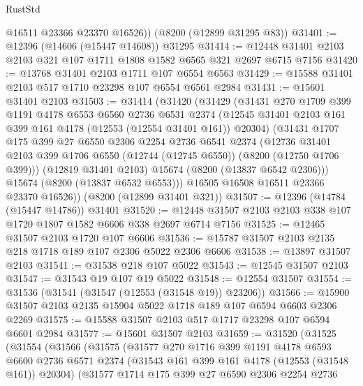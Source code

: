 \begin{lexlean}{RustStd}
\begin{coremodule}
        @16511
        @23366
        @23370
        @16526))
    (@8200 (@12899 @31295 @83))
@31401 := @12396 (@14606 (@15447 @14608)) @31295
@31414 := @12448 @31401 @2103 @2103 @321 @107 @1711 @1808 @1582 @6565 @321 @2697 @6715 @7156
@31420 := @13768 @31401 @2103 @1711 @107 @6554 @6563
@31429 := @15588 @31401 @2103 @517 @1710 @23298 @107 @6554 @6561 @2984
@31431 := @15601 @31401 @2103
@31503 := @31414
    (@31420
      (@31429
        (@31431
          @270
          @1709
          @399
          @1191
          @4178
          @6553
          @6560
          @2736
          @6531
          @2374
          (@12545 @31401 @2103 @161 @399 @161 @4178 (@12553 (@12554 @31401 @161)) @20304)
          (@31431
            @1707
            @175
            @399
            @27
            @6550
            @2306
            @2254
            @2736
            @6541
            @2374
            (@12736
              @31401
              @2103
              @399
              @1706
              @6550
              (@12744 (@12745 @6550))
              (@8200 (@12750 @1706 @399)))
            (@12819 @31401 @2103)
            @15674
            (@8200 (@13837 @6542 @2306)))
          @15674
          (@8200 (@13837 @6532 @6553)))
        @16505
        @16508
        @16511
        @23366
        @23370
        @16526))
    (@8200 (@12899 @31401 @321))
@31507 := @12396 (@14784 (@15447 @14786)) @31401
@31520 := @12448 @31507 @2103 @2103 @338 @107 @1720 @1807 @1582 @6606 @338 @2697 @6714 @7156
@31525 := @12465 @31507 @2103 @1720 @107 @6606
@31536 := @15787 @31507 @2103 @2135 @218 @1718 @189 @107 @2306 @5022 @2306 @6606
@31538 := @13897 @31507 @2103
@31541 := @31538 @218 @107 @5022
@31543 := @12545 @31507 @2103
@31547 := @31543 @19 @107 @19 @5022
@31548 := @12554 @31507
@31554 := @31536 (@31541 (@31547 (@12553 (@31548 @19)) @23206))
@31566 := @15900 @31507 @2103 @2135 @15904 @5022 @1718 @189 @107 @6594 @6603 @2306 @2269
@31575 := @15588 @31507 @2103 @517 @1717 @23298 @107 @6594 @6601 @2984
@31577 := @15601 @31507 @2103
@31659 := @31520
    (@31525
      (@31554
        (@31566
          (@31575
            (@31577
              @270
              @1716
              @399
              @1191
              @4178
              @6593
              @6600
              @2736
              @6571
              @2374
              (@31543 @161 @399 @161 @4178 (@12553 (@31548 @161)) @20304)
              (@31577
                @1714
                @175
                @399
                @27
                @6590
                @2306
                @2254
                @2736

\end{coremodule}
\end{lexlean}
